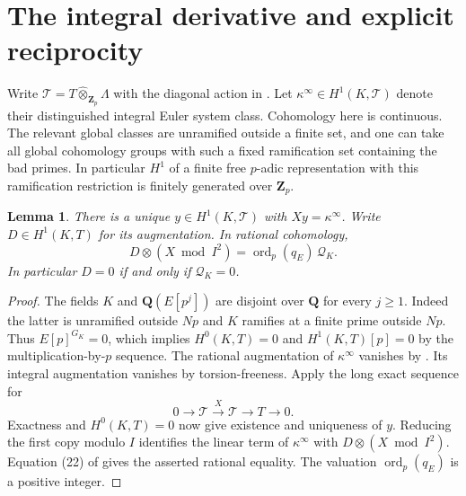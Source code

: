 \documentclass[11pt]{article}
\newtheorem{lemma}[theorem]{Lemma}
\newcommand{\Z}{\mathbf Z}
\newcommand{\Q}{\mathbf Q}
\newcommand{\ord}{\operatorname{ord}}
\begin{document}
\section{The integral derivative and explicit reciprocity}

Write \(\mathcal{T}=T\widehat{\otimes}_{\Z_p}\Lambda\) with the diagonal action in \cite[\S3]{FG}. Let \(\kappa^\infty\in H^1(K,\mathcal{T})\) denote their distinguished integral Euler system class. Cohomology here is continuous. The relevant global classes are unramified outside a finite set, and one can take all global cohomology groups with such a fixed ramification set containing the bad primes. In particular \(H^1\) of a finite free \(p\)-adic representation with this ramification restriction is finitely generated over \(\Z_p\).

\begin{lemma}\label{lem:int}
There is a unique \(y\in H^1(K,\mathcal{T})\) with \(Xy=\kappa^\infty\). Write \(D\in H^1(K,T)\) for its augmentation. In rational cohomology,
\[
       D\otimes(X\bmod I^2)=\ord_p(q_E)\,\mathcal Q_K .
\]
In particular \(D=0\) if and only if \(\mathcal Q_K=0\).
\end{lemma}
\begin{proof}
The fields \(K\) and \(\Q(E[p^j])\) are disjoint over \(\Q\) for every \(j\geq1\). Indeed the latter is unramified outside \(Np\) and \(K\) ramifies at a finite prime outside \(Np\). Thus \(E[p]^{G_K}=0\), which implies \(H^0(K,T)=0\) and \(H^1(K,T)[p]=0\) by the multiplication-by-\(p\) sequence. The rational augmentation of \(\kappa^\infty\) vanishes by \cite[Lem.~3.12]{FG}. Its integral augmentation vanishes by torsion-freeness. Apply the long exact sequence for
\[
 0\longrightarrow\mathcal{T}\xrightarrow{\ X\ }\mathcal{T}
     \longrightarrow T\longrightarrow0 .
\]
Exactness and \(H^0(K,T)=0\) now give existence and uniqueness of \(y\). Reducing the first copy modulo \(I\) identifies the linear term of \(\kappa^\infty\) with \(D\otimes(X\bmod I^2)\). Equation (22) of \cite{FG} gives the asserted rational equality. The valuation \(\ord_p(q_E)\) is a positive integer.
\end{proof}
\end{document}
